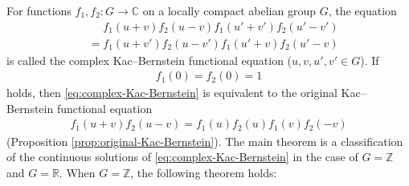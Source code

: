 \documentclass[12pt]{article}
\theoremstyle{definition}
\theoremstyle{remark}
\numberwithin{equation}{section}
\numberwithin{figure}{section}
\numberwithin{table}{section}
\begin{document}
For functions $ f_1 , f_2 \colon G \to \mathbb{ C } $ on a locally compact abelian group $ G $, the equation
\begin{align}
  & \phantom{ {} = {} }  f_1 ( u + v ) f_2 ( u - v ) f_1 ( u' + v' ) f_2 ( u' - v' ) \\
  & = f_1 ( u + v' ) f_2 ( u - v' ) f_1 ( u' + v ) f_2 ( u' - v ) \label{eq:complex-Kac-Bernstein}
\end{align}
is called the complex Kac--Bernstein functional equation ($ u , v , u' , v' \in G $).
If 
\begin{align}
    f_1 ( 0 ) = f_2 ( 0 ) = 1 \label{eq:probability-dual}
\end{align}
holds, then \eqref{eq:complex-Kac-Bernstein} is equivalent to the original Kac--Bernstein functional equation
\begin{align}
    f_1 ( u + v ) f_2 (u - v ) = f_1 ( u ) f_2 ( u ) f_1 ( v ) f_2 ( - v ) \label{eq:Kac-Bernstein-original}
\end{align}
(Proposition \ref{prop:original-Kac-Bernstein}).
The main theorem is a classification of the continuous solutions of \eqref{eq:complex-Kac-Bernstein} in the case of $ G = \mathbb{ Z } $ and $ G = \mathbb{ R } $.
When $ G = \mathbb{ Z } $, the following theorem holds:
\end{document}
